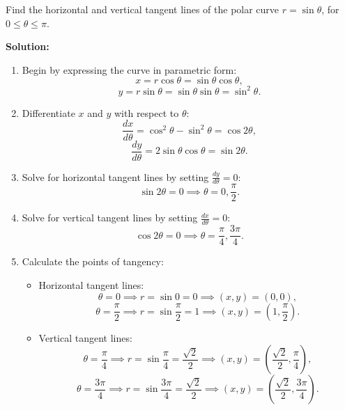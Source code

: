 \documentclass[12pt]{article}
\theoremstyle{beautifulthm}
\begin{document}
\begin{tcolorbox}[colback=examplebg, colframe=red!75!black, title=\textbf{EXAMPLE 6: Finding Horizontal and Vertical Tangent Lines}, fonttitle=\bfseries, sharp corners]

Find the horizontal and vertical tangent lines of the polar curve \( r = \sin \theta \), for \( 0 \leq \theta \leq \pi \).

\tcblower
\textbf{Solution:} 
\begin{enumerate}
    \item Begin by expressing the curve in parametric form:
    \[
    x = r \cos \theta = \sin \theta \cos \theta,
    \]
    \[
    y = r \sin \theta = \sin \theta \sin \theta = \sin^2 \theta.
    \]

    \item Differentiate \( x \) and \( y \) with respect to \( \theta \):
    \[
    \frac{dx}{d\theta} = \cos^2 \theta - \sin^2 \theta = \cos 2\theta,
    \]
    \[
    \frac{dy}{d\theta} = 2 \sin \theta \cos \theta = \sin 2\theta.
    \]

    \item Solve for horizontal tangent lines by setting \( \frac{dy}{d\theta} = 0 \):
    \[
    \sin 2\theta = 0 \implies \theta = 0, \frac{\pi}{2}.
    \]

    \item Solve for vertical tangent lines by setting \( \frac{dx}{d\theta} = 0 \):
    \[
    \cos 2\theta = 0 \implies \theta = \frac{\pi}{4}, \frac{3\pi}{4}.
    \]

    \item Calculate the points of tangency:
    \begin{itemize}
        \item Horizontal tangent lines:
        \[
        \theta = 0 \implies r = \sin 0 = 0 \implies (x, y) = (0, 0),
        \]
        \[
        \theta = \frac{\pi}{2} \implies r = \sin \frac{\pi}{2} = 1 \implies (x, y) = (1, \frac{\pi}{2}).
        \]

        \item Vertical tangent lines:
        \[
        \theta = \frac{\pi}{4} \implies r = \sin \frac{\pi}{4} = \frac{\sqrt{2}}{2} \implies (x, y) = \left(\frac{\sqrt{2}}{2}, \frac{\pi}{4}\right),
        \]
        \[
        \theta = \frac{3\pi}{4} \implies r = \sin \frac{3\pi}{4} = \frac{\sqrt{2}}{2} \implies (x, y) = \left(\frac{\sqrt{2}}{2}, \frac{3\pi}{4}\right).
        \]
    \end{itemize}
\end{enumerate}
\end{tcolorbox}
\end{document}
